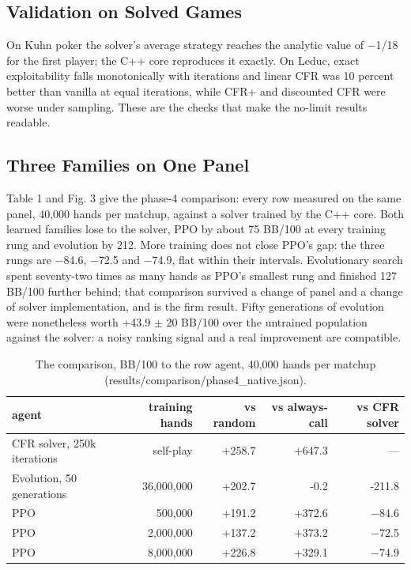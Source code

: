 \documentclass[runningheads]{llncs}
\begin{document}
\subsection{Validation on Solved Games}
On Kuhn poker the solver's average strategy reaches the analytic value of $-$1/18 for the first player; the C++ core reproduces it exactly. On Leduc, exact exploitability falls monotonically with iterations and linear CFR was 10 percent better than vanilla at equal iterations, while CFR+ and discounted CFR were worse under sampling. These are the checks that make the no-limit results readable.

\subsection{Three Families on One Panel}
Table 1 and Fig. 3 give the phase-4 comparison: every row measured on the same panel, 40,000 hands per matchup, against a solver trained by the C++ core. Both learned families lose to the solver, PPO by about 75 BB/100 at every training rung and evolution by 212. More training does not close PPO's gap: the three rungs are $-$84.6, $-$72.5 and $-$74.9, flat within their intervals. Evolutionary search spent seventy-two times as many hands as PPO's smallest rung and finished 127 BB/100 further behind; that comparison survived a change of panel and a change of solver implementation, and is the firm result. Fifty generations of evolution were nonetheless worth +43.9 $\pm$ 20 BB/100 over the untrained population against the solver: a noisy ranking signal and a real improvement are compatible.

\begin{table}[t]
\caption{The comparison, BB/100 to the row agent, 40,000 hands per matchup (results/comparison/phase4\_native.json).}
\label{tab:1}
\centering
\small
\begin{tabular}{lrrrr}
\toprule
agent & training hands & vs random & vs always-call & vs CFR solver \\
\midrule
CFR solver, 250k iterations & self-play & +258.7 & +647.3 & — \\
Evolution, 50 generations & 36,000,000 & +202.7 & -0.2 & -211.8 \\
PPO & 500,000 & +191.2 & +372.6 & $-$84.6 \\
PPO & 2,000,000 & +137.2 & +373.2 & $-$72.5 \\
PPO & 8,000,000 & +226.8 & +329.1 & $-$74.9 \\
\bottomrule
\end{tabular}
\end{table}
\end{document}
